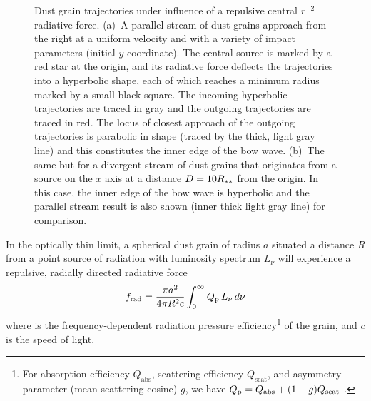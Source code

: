 \begin{figure}
  \caption[Dust grain trajectories]{Dust grain trajectories under
    influence of a repulsive central \(r^{-2}\) radiative force.
    (a)~A parallel stream of dust grains approach from the right at a
    uniform velocity and with a variety of impact parameters (initial
    \(y\)-coordinate). The central source is marked by a red star at
    the origin, and its radiative force deflects the trajectories into
    a hyperbolic shape, each of which reaches a minimum radius marked
    by a small black square.  The incoming hyperbolic trajectories are
    traced in gray and the outgoing trajectories are traced in red.
    The locus of closest approach of the outgoing trajectories is
    parabolic in shape (traced by the thick, light gray line) and this
    constitutes the inner edge of the bow wave.  (b)~The same but for
    a divergent stream of dust grains that originates from a source on
    the \(x\) axis at a distance \(D = 10 R_{**}\) from the
    origin.  In this case, the inner edge of the bow wave is
    hyperbolic and the parallel stream result is also shown (inner
    thick light gray line) for comparison.}
  \label{fig:dust-trajectories}
\end{figure}



In the optically thin limit, a spherical dust grain of radius \(a\)
situated a distance \(R\) from a point source of radiation with
luminosity spectrum \(L_\nu\) will experience a repulsive, radially
directed radiative force \citep[e.g.,][]{Spitzer:1978a}
\begin{equation}
  \label{eq:dust-rad-force}
  f_{\text{rad}} = \frac{\pi a^2 } {4 \pi R^2 c}  \int_0^\infty Q_{\text{p}} \, L_\nu \, d\nu 
\end{equation}
where \Qp{} is the frequency-dependent radiation pressure efficiency\footnote{%
  \label{fn:Qp}
  For absorption efficiency \(Q_{\text{abs}}\), scattering efficiency
  \(Q_{\text{scat}}\), and asymmetry parameter (mean scattering
  cosine) \(g\), we have
  \(Q_{\text{p}} = Q_{\text{abs}} + (1 - g) Q_{\text{scat}}\) \citep[e.g.,
  \S~4.5 of][]{Bohren:1983a}.} %
of the grain, and \(c\) is the speed of light.


